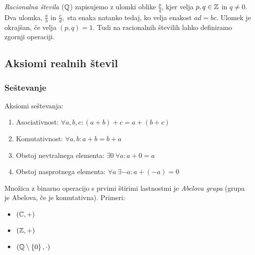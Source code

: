 \documentclass[12pt, a4paper]{article}
\begin{document}
\begin{definicija}
\emph{Racionalna števila} ($\mathbb{Q}$) zapisujemo z ulomki oblike $\frac{p}{q}$, kjer velja $p, q\in\mathbb{Z}$ in $q\ne 0$. Dva ulomka, $\frac{a}{b}$ in $\frac{c}{d},$ sta enaka natanko tedaj, ko velja enakost $ad=bc$. Ulomek je okrajšan, če velja $(p, q)=1$. Tudi na racionalnih številih lahko definiramo zgornji operaciji.
\end{definicija}

\newpage

\subsection{Aksiomi realnih števil}

\subsubsection{Seštevanje}

\begin{okvir}
\begin{definicija}
Aksiomi seštevanja:

\begin{enumerate}[label=A\arabic*.]
\item Asociativnost: $\forall a,b,c\colon(a+b)+c=a+(b+c)$
\item Komutativnost: $\forall a,b\colon a+b=b+a$
\item Obstoj nevtralnega elementa: $\exists 0~\forall a\colon a+0=a$
\item Obstoj nasprotnega elementa: $\forall a~\exists {-a}\colon a+(-a)=0$
\end{enumerate}
\end{definicija}
\end{okvir}

Množica z binarno operacijo s prvimi štirimi lastnostmi je \emph{Abelova grupa} (grupa je Abelova, če je komutativna). Primeri:

\begin{multicols}{3}
\begin{center}
\begin{itemize}
\item $(\mathbb{C},+)$
\item $(\mathbb{Z},+)$
\item $(\mathbb{Q}\setminus\left\{0\right\},\cdot)$
\end{itemize}
\end{center}
\end{multicols}
\end{document}
